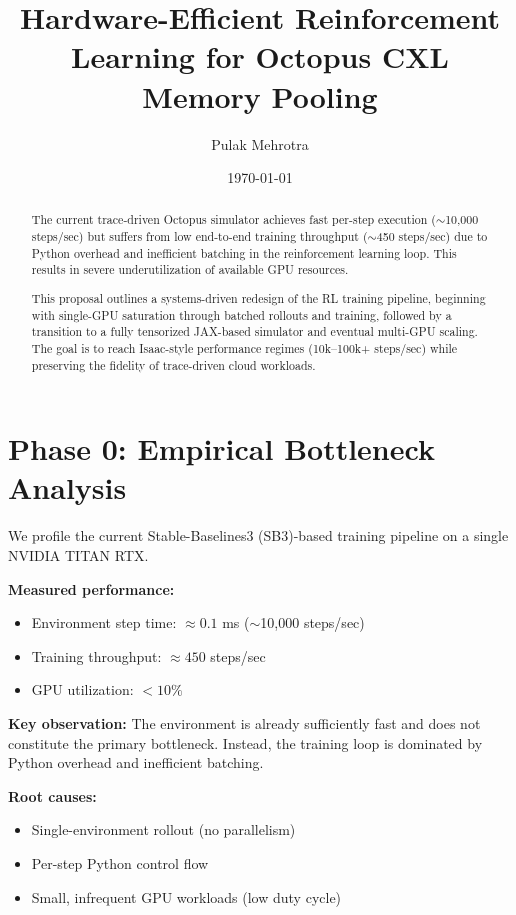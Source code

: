 \documentclass[11pt]{article}
\title{Hardware-Efficient Reinforcement Learning for Octopus CXL Memory Pooling}
\author{Pulak Mehrotra}
\date{\today}
\begin{document}
\maketitle

\begin{abstract}
The current trace-driven Octopus simulator achieves fast per-step execution
($\sim$10,000 steps/sec) but suffers from low end-to-end training throughput
($\sim$450 steps/sec) due to Python overhead and inefficient batching in the
reinforcement learning loop. This results in severe underutilization of
available GPU resources.

This proposal outlines a systems-driven redesign of the RL training
pipeline, beginning with single-GPU saturation through batched rollouts and
training, followed by a transition to a fully tensorized JAX-based simulator
and eventual multi-GPU scaling. The goal is to reach Isaac-style performance
regimes (10k--100k+ steps/sec) while preserving the fidelity of trace-driven
cloud workloads.
\end{abstract}

\section{Phase 0: Empirical Bottleneck Analysis}

We profile the current Stable-Baselines3 (SB3)-based training pipeline on a
single NVIDIA TITAN RTX.

\textbf{Measured performance:}
\begin{itemize}
    \item Environment step time: $\approx 0.1$ ms ($\sim$10,000 steps/sec)
    \item Training throughput: $\approx 450$ steps/sec
    \item GPU utilization: $<10\%$
\end{itemize}

\textbf{Key observation:} The environment is already sufficiently fast and does
not constitute the primary bottleneck. Instead, the training loop is dominated
by Python overhead and inefficient batching.

\textbf{Root causes:}
\begin{itemize}
    \item Single-environment rollout (no parallelism)
    \item Per-step Python control flow
    \item Small, infrequent GPU workloads (low duty cycle)
\end{itemize}
\end{document}
